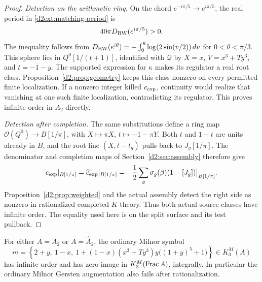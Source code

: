 \begin{proof}
\emph{Detection on the arithmetic ring.}
On the chord $e^{-i\pi/5}\to e^{i\pi/5}$, the real period in \eqref{d2ext:matching-period} is
\[
 40\pi D_{\rm BW}(e^{i\pi/5})>0.
\]
The inequality follows from
$D_{\rm BW}(e^{i\theta})=-\int_0^\theta
\log(2\sin(v/2))\,dv$ for $0<\theta<\pi/3$.
This sphere lies in $Q^0[1/(t+1)]$, identified with $\mathcal Q$
by $X=x$, $V=x^3+Ty^3$, and $t=-1-y$.
The supported expression for $\kappa$ makes its regulator a real
root class. Proposition~\ref{d2:prop:geometry} keeps this class
nonzero on every permitted finite localization. If a nonzero
integer killed $c_{\rm exp}$, continuity would realize that
vanishing at one such finite localization, contradicting its
regulator. This proves infinite order in $A_2$ directly.

\emph{Detection after completion.}
The same substitutions define a ring map
$\mathcal O(Q^0)\to B[1/\pi]$,
with $X\mapsto\pi X$, $t\mapsto-1-\pi Y$.
Both $t$ and $1-t$ are units already in $B$, and the root line
$(X,t-t_g)$ pulls back to $J_g[1/\pi]$.
The denominator and completion maps of
Section~\ref{d2:sec:assembly} therefore give
\[
 c_{\rm exp}|_{B[1/\pi]}
 =\widehat c_{\rm exp}|_{B[1/\pi]}
 =-\frac12\sum_g\sigma_g(\beta)(1-[J_g])\big|_{B[1/\pi]}.
\]
Proposition~\ref{d2:prop:weighted} and the actual assembly
detect the right side as nonzero in rationalized completed
$K$-theory. Thus both actual source classes have infinite order.
The equality used here is on the split surface and its test pullback.
\end{proof}

\begin{corollary}
\label{d2ext:twodimexplicitMilnor}
For either $A=A_2$ or $A=\widehat A_2$, the ordinary Milnor symbol
\[
 m=\left\{2+y,\ 1-x,\
 1+(1-x)(x^3+Ty^3)y\bigl((1+y)^5+1\bigr)\right\}
       \in K_3^M(A)
\]
has infinite order and has zero image in
$K_3^M(\operatorname{Frac} A)$, integrally. In particular the ordinary
Milnor Gersten augmentation also fails after rationalization.
\end{corollary}

